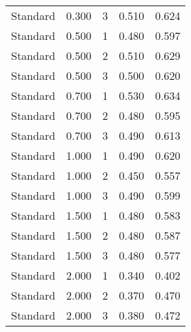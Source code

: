 \begin{tabular}{lrrrr}
Standard & 0.300 & 3 & 0.510 & 0.624 \\
Standard & 0.500 & 1 & 0.480 & 0.597 \\
Standard & 0.500 & 2 & 0.510 & 0.629 \\
Standard & 0.500 & 3 & 0.500 & 0.620 \\
Standard & 0.700 & 1 & 0.530 & 0.634 \\
Standard & 0.700 & 2 & 0.480 & 0.595 \\
Standard & 0.700 & 3 & 0.490 & 0.613 \\
Standard & 1.000 & 1 & 0.490 & 0.620 \\
Standard & 1.000 & 2 & 0.450 & 0.557 \\
Standard & 1.000 & 3 & 0.490 & 0.599 \\
Standard & 1.500 & 1 & 0.480 & 0.583 \\
Standard & 1.500 & 2 & 0.480 & 0.587 \\
Standard & 1.500 & 3 & 0.480 & 0.577 \\
Standard & 2.000 & 1 & 0.340 & 0.402 \\
Standard & 2.000 & 2 & 0.370 & 0.470 \\
Standard & 2.000 & 3 & 0.380 & 0.472 \\
\bottomrule
\end{tabular}
